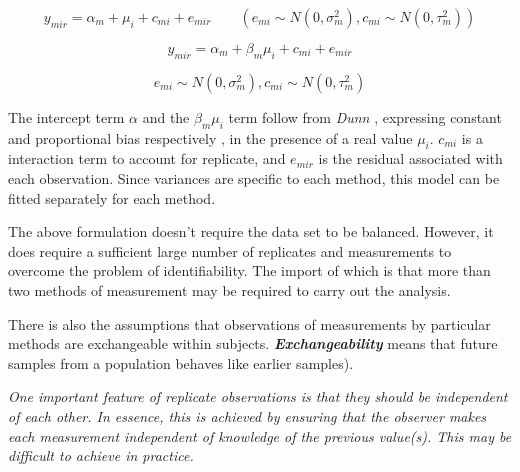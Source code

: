 \documentclass{report}
\begin{document}
	{
		
		\begin{equation}
		y_{mir}  = \alpha_{m} + \mu_{i} + c_{mi} + e_{mir} \qquad ( e_{mi}
		\sim N(0,\sigma^{2}_{m}), c_{mi} \sim N(0,\tau^{2}_{m}))
		\end{equation}
		
		
		\begin{equation}
		y_{mir}  = \alpha_{m} + \beta_{m}\mu_{i} + c_{mi} + e_{mir} 
		\end{equation}
	}
	
	{
		
		\[ e_{mi} \sim N(0,\sigma^{2}_{m}), c_{mi} \sim N(0,\tau^{2}_{m})\]
	}
	
	
	The intercept term $\alpha$ and the $\beta_{m}\mu_{i}$ term follow
	from \textit{Dunn} \cite{DunnSEME}, expressing constant and proportional bias
	respectively , in the presence of a real value $\mu_{i}.$
	$c_{mi}$ is a interaction term to account for replicate, and
	$e_{mir}$ is the residual associated with each observation.
	Since variances are specific to each method, this model can be
	fitted separately for each method.
	
	
	
	
	The above formulation doesn't require the data set to be balanced.
	However, it does require a sufficient large number of replicates
	and measurements to overcome the problem of identifiability. 
	The
	import of which is that more than two methods of measurement may
	be required to carry out the analysis. 
	
	There is also the
	assumptions that observations of measurements by particular
	methods are exchangeable within subjects.  \textbf{\textit{Exchangeability}} means
	that future samples from a population behaves like earlier
	samples).
	
	
	
	\emph{
		One important feature of replicate observations is that they should be independent
		of each other. In essence, this is achieved by ensuring that the observer makes each
		measurement independent of knowledge of the previous value(s). This may be difficult
		to achieve in practice.}
	
\end{document}
